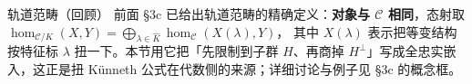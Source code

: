 \begin{conceptbox}{轨道范畴（回顾）}
前面 \S3c 已给出轨道范畴的精确定义：\textbf{对象与 $\mathcal{C}$ 相同}，态射取
$\hom_{\mathcal{C}/K}(X,Y)=\bigoplus_{\lambda\in\widehat{K}}\hom_{\mathcal{C}}(X(\lambda),Y)$，
其中 $X(\lambda)$ 表示把等变结构按特征标 $\lambda$ 扭一下。本节用它把「先限制到子群 $H$、再商掉 $H^{\perp}$」写成全忠实嵌入，这正是扭 Künneth 公式在代数侧的来源；详细讨论与例子见 \S3c 的概念框。
\par\smallskip{}
\end{conceptbox}

